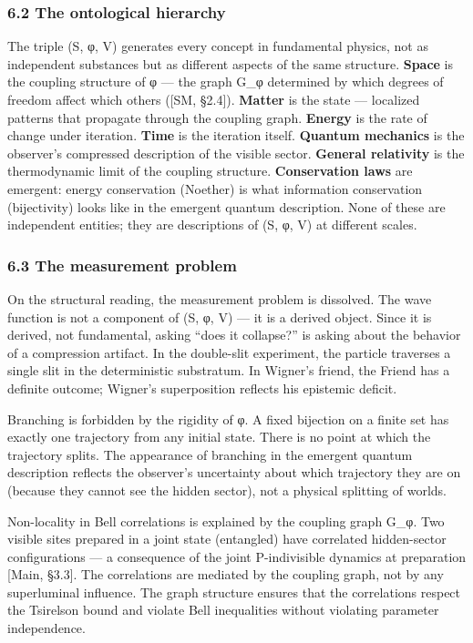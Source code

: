 \documentclass[
]{article}
\begin{document}
\hypertarget{the-ontological-hierarchy}{%
\subsubsection{6.2 The ontological
hierarchy}\label{the-ontological-hierarchy}}

The triple (S, φ, V) generates every concept in fundamental physics, not
as independent substances but as different aspects of the same
structure. \textbf{Space} is the coupling structure of φ --- the graph
G\_φ determined by which degrees of freedom affect which others ({[}SM,
§2.4{]}). \textbf{Matter} is the state --- localized patterns that
propagate through the coupling graph. \textbf{Energy} is the rate of
change under iteration. \textbf{Time} is the iteration itself.
\textbf{Quantum mechanics} is the observer's compressed description of
the visible sector. \textbf{General relativity} is the thermodynamic
limit of the coupling structure. \textbf{Conservation laws} are
emergent: energy conservation (Noether) is what information conservation
(bijectivity) looks like in the emergent quantum description. None of
these are independent entities; they are descriptions of (S, φ, V) at
different scales.

\hypertarget{the-measurement-problem}{%
\subsubsection{6.3 The measurement
problem}\label{the-measurement-problem}}

On the structural reading, the measurement problem is dissolved. The
wave function is not a component of (S, φ, V) --- it is a derived
object. Since it is derived, not fundamental, asking ``does it
collapse?'' is asking about the behavior of a compression artifact. In
the double-slit experiment, the particle traverses a single slit in the
deterministic substratum. In Wigner's friend, the Friend has a definite
outcome; Wigner's superposition reflects his epistemic deficit.

Branching is forbidden by the rigidity of φ. A fixed bijection on a
finite set has exactly one trajectory from any initial state. There is
no point at which the trajectory splits. The appearance of branching in
the emergent quantum description reflects the observer's uncertainty
about which trajectory they are on (because they cannot see the hidden
sector), not a physical splitting of worlds.

Non-locality in Bell correlations is explained by the coupling graph
G\_φ. Two visible sites prepared in a joint state (entangled) have
correlated hidden-sector configurations --- a consequence of the joint
P-indivisible dynamics at preparation {[}Main, §3.3{]}. The correlations
are mediated by the coupling graph, not by any superluminal influence.
The graph structure ensures that the correlations respect the Tsirelson
bound and violate Bell inequalities without violating parameter
independence.
\end{document}
